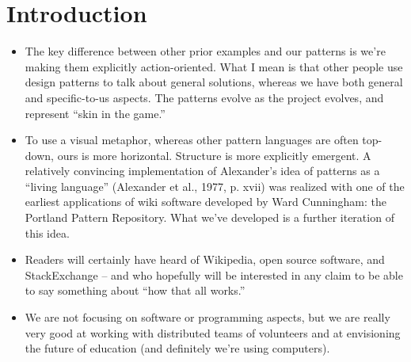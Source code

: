 \section{Introduction}

\begin{itemize}
\item The key difference between other prior examples and our
patterns is we're making them explicitly action-oriented.  What I mean
is that other people use design patterns to talk about general
solutions, whereas we have both general and specific-to-us aspects.
The patterns evolve as the project evolves, and represent ``skin in the game.''
\item To use a visual metaphor, whereas other pattern languages are often top-down,
ours is more horizontal.  Structure is more explicitly emergent.  A relatively convincing implementation of Alexander’s idea of patterns as a “living language” (Alexander et al., 1977, p. xvii)
was realized with one of the earliest applications of wiki software developed by Ward
Cunningham: the Portland Pattern Repository.  What we've developed is a further iteration of this idea.
\item Readers will certainly have heard of Wikipedia, open source
software, and StackExchange -- and who hopefully will be interested in
any claim to be able to say something about ``how that all works.''
\item We are not focusing on software or programming aspects, but we
are really very good at working with distributed teams of volunteers and
at envisioning the future of education (and definitely we're using
computers).
\end{itemize}